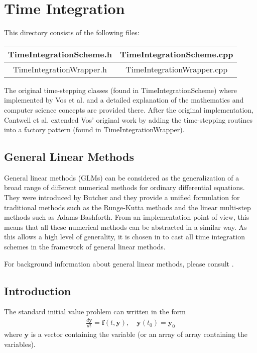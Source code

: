 %
\section{Time Integration}

This directory consists of the following files:


\begin{center}
\begin{tabular}{|c | c | } \hline
TimeIntegrationScheme.h & TimeIntegrationScheme.cpp	\\ \hline 
TimeIntegrationWrapper.h & TimeIntegrationWrapper.cpp \\ \hline
\end{tabular}
\end{center}

The original time-stepping classes (found in TimeIntegrationScheme)
where implemented by Vos et al. \cite{Vostime} and a detailed
explanation of the mathematics and computer science concepts are
provided there.  After the original implementation, Cantwell et
al. extended Vos' original work by adding the time-stepping routines
into a factory pattern (found in TimeIntegrationWrapper).

\subsection{General Linear Methods}
General linear methods (GLMs) can be considered as the generalization of a broad
range of different numerical methods for ordinary differential equations.  They
were introduced by Butcher and they provide a unified formulation for
traditional methods such as the Runge-Kutta methods and the linear multi-step
methods such as Adams-Bashforth.  
From an implementation point of view, this means that all these
numerical methods can be abstracted in a similar way. As this allows a high
level of generality, it is chosen in {\nek} to cast all time integration
schemes in the framework of general linear methods.

For background information about general linear methods, please consult
\cite{Bu06}.

\subsection{Introduction}
The standard initial value problem can written in the form
\begin{align*}
\frac{d\boldsymbol{y}}{dt} = \boldsymbol{f}(t,\boldsymbol{y}),\quad
\boldsymbol{y}(t_0)=\boldsymbol{y}_0
\end{align*}
where $\boldsymbol{y}$ is a vector containing the variable (or an
array of array containing the variables).


